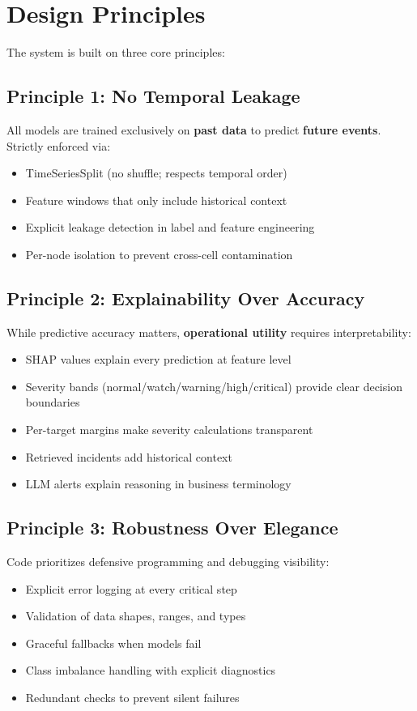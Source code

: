 \documentclass[11pt,a4paper,oneside]{report}
\begin{document}
\section{Design Principles}

The system is built on three core principles:

\subsection{Principle 1: No Temporal Leakage}

All models are trained exclusively on \textbf{past data} to predict \textbf{future events}. Strictly enforced via:
\begin{itemize}
    \item TimeSeriesSplit (no shuffle; respects temporal order)
    \item Feature windows that only include historical context
    \item Explicit leakage detection in label and feature engineering
    \item Per-node isolation to prevent cross-cell contamination
\end{itemize}

\subsection{Principle 2: Explainability Over Accuracy}

While predictive accuracy matters, \textbf{operational utility} requires interpretability:
\begin{itemize}
    \item SHAP values explain every prediction at feature level
    \item Severity bands (normal/watch/warning/high/critical) provide clear decision boundaries
    \item Per-target margins make severity calculations transparent
    \item Retrieved incidents add historical context
    \item LLM alerts explain reasoning in business terminology
\end{itemize}

\subsection{Principle 3: Robustness Over Elegance}

Code prioritizes defensive programming and debugging visibility:
\begin{itemize}
    \item Explicit error logging at every critical step
    \item Validation of data shapes, ranges, and types
    \item Graceful fallbacks when models fail
    \item Class imbalance handling with explicit diagnostics
    \item Redundant checks to prevent silent failures
\end{itemize}
\end{document}
